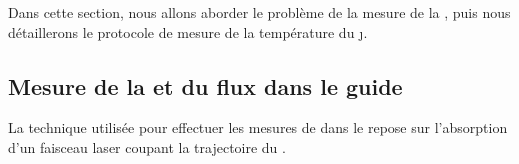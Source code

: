 Dans cette section, nous allons aborder le problème de la mesure de la \dat, puis nous détaillerons le protocole de mesure de la température du \j.




\subsection{Mesure de la \datlin et du flux dans le guide}\label{sec:MesureDensiteGuide}
La technique utilisée pour effectuer les mesures de \datlin dans le \gm repose sur l'absorption d'un faisceau laser coupant la trajectoire du \jat. 

